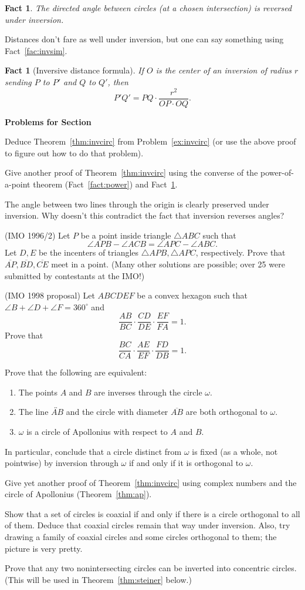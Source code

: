 \documentclass[12pt]{book}
\newcounter{exc}
\numberwithin{exc}{section}
\numberwithin{figure}{section}
\newenvironment{exer}{\vspace{0.1in}
\noindent \textbf{Problems for Section~\thesection} \vspace{0.1in}
\begin{list}{\arabic{exc}.}{\usecounter{exc}}}{\end{list}}
\newtheorem{fact}[theorem]{Fact}
\numberwithin{equation}{theorem}
\def\ii{\item}
\def\line#1{\overleftrightarrow{#1}}
\def\seg#1{\overline{#1}}
\begin{document}
\begin{fact} \label{thm:invang}
The directed angle between circles (at a chosen intersection)
is reversed under inversion.
\end{fact}

Distances don't fare as well under inversion, but one can say 
something using Fact~\ref{fac:invsim}.
\begin{fact}[Inversive distance formula] \label{thm:invdist}
If $O$ is the center of an inversion of radius $r$ sending $P$ to $P'$ 
and $Q$ to $Q'$, then
\[
P'Q' = PQ \cdot \frac{r^2}{OP \cdot OQ}.
\]
\end{fact}

\begin{exer}
\ii
Deduce Theorem~\ref{thm:invcirc} from Problem~\ref{ex:invcirc}
(or use the above proof to figure out how to do that problem).
\ii
Give another proof of Theorem~\ref{thm:invcirc} using the converse of
the power-of-a-point theorem (Fact~\ref{fact:power}) and
Fact~\ref{thm:invdist}.
\ii
The angle between two lines through the origin is clearly preserved 
under inversion. Why doesn't this contradict the fact that inversion 
reverses angles?
\ii
(IMO 1996/2)
Let $P$ be a point inside triangle $\triangle ABC$ such that
\[
\angle APB - \angle ACB = \angle APC - \angle ABC.
\]
Let $D,E$ be the incenters of triangles $\triangle APB, \triangle APC$, 
respectively. 
Prove that $\seg{AP}, \seg{BD}, \seg{CE}$ 
meet in a point. (Many other solutions are 
possible; over 25 were submitted by contestants at the IMO!)
\ii (IMO 1998 proposal)
Let $ABCDEF$ be a convex hexagon such that $\angle B + \angle D + 
\angle F = 360^{\circ}$ and
\[
\frac{AB}{BC} \cdot \frac{CD}{DE} \cdot \frac{EF}{FA} = 1.
\]
Prove that
\[
\frac{BC}{CA} \cdot \frac{AE}{EF} \cdot \frac{FD}{DB} = 1.
\]
\ii
Prove that the following are equivalent:
\begin{enumerate}
\item
The points $A$ and $B$ are inverses through the circle $\omega$.
\item
The line $\line{AB}$ and the circle with diameter $\seg{AB}$ are both
orthogonal to $\omega$.
\item
$\omega$ is a circle of Apollonius with respect to $A$ and $B$.
\end{enumerate}
In particular, conclude that 
a circle 
distinct from $\omega$ is fixed (as a whole, not pointwise) by
inversion through $\omega$
if and only if it is orthogonal to $\omega$.
\ii
Give yet another proof of Theorem~\ref{thm:invcirc} using
complex numbers and the circle of Apollonius
(Theorem~\ref{thm:ap}).

\ii
Show that a set of circles is coaxial if and only if there is a circle 
orthogonal to all of them. Deduce that
coaxial circles remain that way under inversion. Also, try drawing 
a family of coaxial circles and some circles orthogonal to them; the 
picture is very pretty.

\ii \label{ex:conc}
Prove that any two nonintersecting circles can be inverted into 
concentric circles. (This will be used in Theorem~\ref{thm:steiner} below.)
\end{exer}
\end{document}
